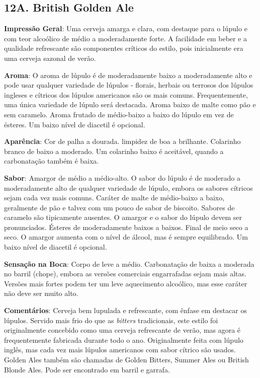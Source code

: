 \subsection*{12A. British Golden Ale}
\textbf{Impressão Geral}: Uma cerveja amarga e clara, com destaque para o lúpulo e com teor alcoólico de médio a moderadamente forte. A facilidade em beber e a qualidade refrescante são componentes críticos do estilo, pois inicialmente era uma cerveja sazonal de verão.

\textbf{Aroma}: O aroma de lúpulo é de moderadamente baixo a moderadamente alto e pode usar qualquer variedade de lúpulos - florais, herbais ou terrosos dos lúpulos ingleses e cítricos dos lúpulos americanos são os mais comuns. Frequentemente, uma única variedade de lúpulo será destacada. Aroma baixo de malte como pão e sem caramelo. Aroma frutado de médio-baixo a baixo do lúpulo em vez de ésteres. Um baixo nível de diacetil é opcional.

\textbf{Aparência}: Cor de palha a dourada. limpidez de boa a brilhante. Colarinho branco de baixo a moderado. Um colarinho baixo é aceitável, quando a carbonatação também é baixa.

\textbf{Sabor}: Amargor de médio a médio-alto. O sabor do lúpulo é de moderado a moderadamente alto de qualquer variedade de lúpulo, embora os sabores cítricos sejam cada vez mais comuns. Caráter de malte de médio-baixo a baixo, geralmente de pão e talvez com um pouco de sabor de biscoito. Sabores de caramelo são tipicamente ausentes. O amargor e o sabor do lúpulo devem ser pronunciados. Ésteres de moderadamente baixos a baixos. Final de meio seco a seco. O amargor aumenta com o nível de álcool, mas é sempre equilibrado. Um baixo nível de diacetil é opcional.

\textbf{Sensação na Boca}: Corpo de leve a médio. Carbonatação de baixa a moderada no barril (chope), embora as versões comerciais engarrafadas sejam mais altas. Versões mais fortes podem ter um leve aquecimento alcoólico, mas esse caráter não deve ser muito alto.

\textbf{Comentários}: Cerveja bem lupulada e refrescante, com ênfase em destacar os lúpulos. Servido mais frio do que as \textit{bitters} tradicionais, este estilo foi originalmente concebido como uma cerveja refrescante de verão, mas agora é frequentemente fabricada durante todo o ano. Originalmente feita com lúpulo inglês, mas cada vez mais lúpulos americanos com sabor cítrico são usados. Golden Ales também são chamadas de Golden Bitters, Summer Ales ou British Blonde Ales. Pode ser encontrado em barril e garrafa.

